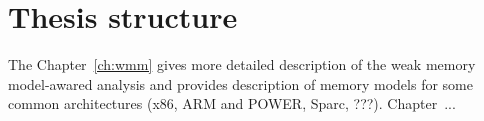 \section{Thesis structure}
\label{ch:intro:structure}

The Chapter~\ref{ch:wmm} gives more detailed description of the weak memory model-awared analysis and provides description of memory models for some common architectures (x86, ARM and POWER, Sparc, ???). Chapter~...

